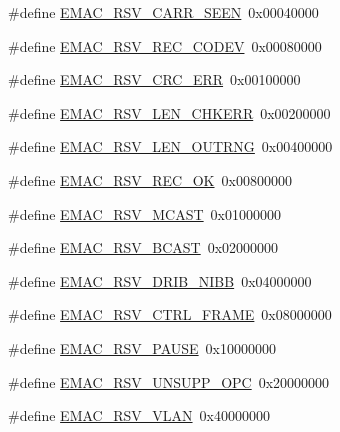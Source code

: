 \begin{DoxyCompactItemize}
\item 
\#define \hyperlink{group___e_m_a_c___private___macros_ga388f4680fb80e6b4e75da1416fe5608b}{\-E\-M\-A\-C\-\_\-\-R\-S\-V\-\_\-\-C\-A\-R\-R\-\_\-\-S\-E\-E\-N}~0x00040000
\item 
\#define \hyperlink{group___e_m_a_c___private___macros_ga6e9fb2eaa66d072bc18a23c3f59f7a0f}{\-E\-M\-A\-C\-\_\-\-R\-S\-V\-\_\-\-R\-E\-C\-\_\-\-C\-O\-D\-E\-V}~0x00080000
\item 
\#define \hyperlink{group___e_m_a_c___private___macros_ga42850ee124b28a2823ba4a6bf9bc0d97}{\-E\-M\-A\-C\-\_\-\-R\-S\-V\-\_\-\-C\-R\-C\-\_\-\-E\-R\-R}~0x00100000
\item 
\#define \hyperlink{group___e_m_a_c___private___macros_gad92ca876c60643b7b0a44d20975ba0ef}{\-E\-M\-A\-C\-\_\-\-R\-S\-V\-\_\-\-L\-E\-N\-\_\-\-C\-H\-K\-E\-R\-R}~0x00200000
\item 
\#define \hyperlink{group___e_m_a_c___private___macros_ga2d2031478d4d23472378935368a0501e}{\-E\-M\-A\-C\-\_\-\-R\-S\-V\-\_\-\-L\-E\-N\-\_\-\-O\-U\-T\-R\-N\-G}~0x00400000
\item 
\#define \hyperlink{group___e_m_a_c___private___macros_ga5ded1ef5d5c08b8d29bd23ba4a98ef1b}{\-E\-M\-A\-C\-\_\-\-R\-S\-V\-\_\-\-R\-E\-C\-\_\-\-O\-K}~0x00800000
\item 
\#define \hyperlink{group___e_m_a_c___private___macros_gaeffa168c11964ac5d90cbee34685001d}{\-E\-M\-A\-C\-\_\-\-R\-S\-V\-\_\-\-M\-C\-A\-S\-T}~0x01000000
\item 
\#define \hyperlink{group___e_m_a_c___private___macros_ga1154e5eca8a1a7b098b45a43b80e5449}{\-E\-M\-A\-C\-\_\-\-R\-S\-V\-\_\-\-B\-C\-A\-S\-T}~0x02000000
\item 
\#define \hyperlink{group___e_m_a_c___private___macros_ga01a011c1dfb1347630cd26ba939e4d8b}{\-E\-M\-A\-C\-\_\-\-R\-S\-V\-\_\-\-D\-R\-I\-B\-\_\-\-N\-I\-B\-B}~0x04000000
\item 
\#define \hyperlink{group___e_m_a_c___private___macros_ga2a8700161566bda5e588c37bac3dba4a}{\-E\-M\-A\-C\-\_\-\-R\-S\-V\-\_\-\-C\-T\-R\-L\-\_\-\-F\-R\-A\-M\-E}~0x08000000
\item 
\#define \hyperlink{group___e_m_a_c___private___macros_gaf952a27c2432b7332e2aabeea402b0a0}{\-E\-M\-A\-C\-\_\-\-R\-S\-V\-\_\-\-P\-A\-U\-S\-E}~0x10000000
\item 
\#define \hyperlink{group___e_m_a_c___private___macros_gac7df12b481e76f135df02b2089c080c4}{\-E\-M\-A\-C\-\_\-\-R\-S\-V\-\_\-\-U\-N\-S\-U\-P\-P\-\_\-\-O\-P\-C}~0x20000000
\item 
\#define \hyperlink{group___e_m_a_c___private___macros_ga007fa1db4265e2a7492c0c678e178300}{\-E\-M\-A\-C\-\_\-\-R\-S\-V\-\_\-\-V\-L\-A\-N}~0x40000000

\end{DoxyCompactItemize}
